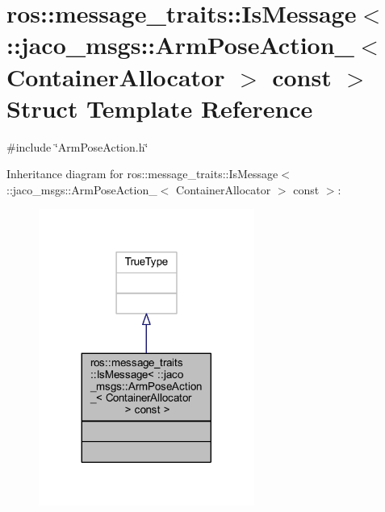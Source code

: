 \hypertarget{structros_1_1message__traits_1_1IsMessage_3_01_1_1jaco__msgs_1_1ArmPoseAction___3_01ContainerAllocator_01_4_01const_01_01_4}{}\section{ros\+:\+:message\+\_\+traits\+:\+:Is\+Message$<$ \+:\+:jaco\+\_\+msgs\+:\+:Arm\+Pose\+Action\+\_\+$<$ Container\+Allocator $>$ const $>$ Struct Template Reference}
\label{structros_1_1message__traits_1_1IsMessage_3_01_1_1jaco__msgs_1_1ArmPoseAction___3_01ContainerAllocator_01_4_01const_01_01_4}


{\ttfamily \#include \char`\"{}Arm\+Pose\+Action.\+h\char`\"{}}



Inheritance diagram for ros\+:\+:message\+\_\+traits\+:\+:Is\+Message$<$ \+:\+:jaco\+\_\+msgs\+:\+:Arm\+Pose\+Action\+\_\+$<$ Container\+Allocator $>$ const $>$\+:
\nopagebreak
\begin{figure}[H]
\begin{center}
\leavevmode
\includegraphics[width=200pt]{d8/d7b/structros_1_1message__traits_1_1IsMessage_3_01_1_1jaco__msgs_1_1ArmPoseAction___3_01ContainerAll9077527f6a0885ccb001cee8f2ca9b4d}
\end{center}
\end{figure}


